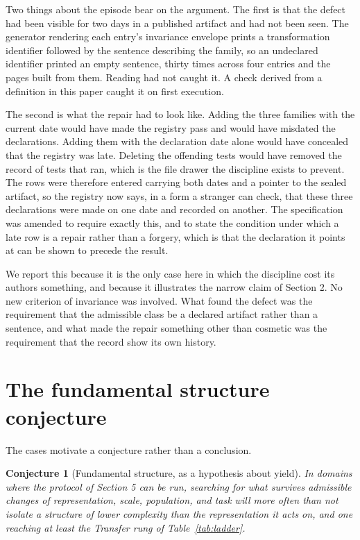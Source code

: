 \documentclass[11pt]{article}
\newtheorem{conjecture}{Conjecture}
\theoremstyle{remark}
\begin{document}
Two things about the episode bear on the argument. The first is that the defect had
been visible for two days in a published artifact and had not been seen. The
generator rendering each entry's invariance envelope prints a transformation
identifier followed by the sentence describing the family, so an undeclared
identifier printed an empty sentence, thirty times across four entries and the pages
built from them. Reading had not caught it. A check derived from a definition in
this paper caught it on first execution.

The second is what the repair had to look like. Adding the three families with the
current date would have made the registry pass and would have misdated the
declarations. Adding them with the declaration date alone would have concealed that
the registry was late. Deleting the offending tests would have removed the record of
tests that ran, which is the file drawer the discipline exists to prevent. The rows
were therefore entered carrying both dates and a pointer to the sealed artifact, so
the registry now says, in a form a stranger can check, that these three declarations
were made on one date and recorded on another. The specification was amended to
require exactly this, and to state the condition under which a late row is a repair
rather than a forgery, which is that the declaration it points at can be shown to
precede the result.

We report this because it is the only case here in which the discipline cost its
authors something, and because it illustrates the narrow claim of Section 2. No new
criterion of invariance was involved. What found the defect was the requirement that
the admissible class be a declared artifact rather than a sentence, and what made
the repair something other than cosmetic was the requirement that the record show
its own history.

\section{The fundamental structure conjecture}

The cases motivate a conjecture rather than a conclusion.

\begin{conjecture}[Fundamental structure, as a hypothesis about yield]
In domains where the protocol of Section 5 can be run, searching for what survives
admissible changes of representation, scale, population, and task will more often
than not isolate a structure of lower complexity than the representation it acts
on, and one reaching at least the Transfer rung of Table~\ref{tab:ladder}.
\end{conjecture}
\end{document}
